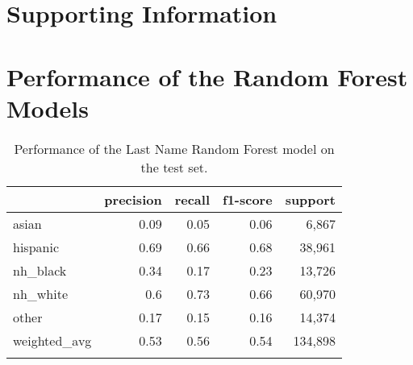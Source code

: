 \documentclass[12pt, letterpaper]{article}
\begin{document}
\clearpage


\clearpage

\appendix
\renewcommand{\thesection}{SI \arabic{section}}
\renewcommand\thetable{\thesection.\arabic{table}}  
\renewcommand\thefigure{\thesection.\arabic{figure}}
\section*{Supporting Information}\label{si}

\section{Performance of the Random Forest Models}\label{rf_perf}

\begin{table}[h!]
\centering
\caption{Performance of the Last Name Random Forest model on the test set.}
\begin{tabular}{lrrrr}
\hline
              &   precision &   recall &   f1-score &   support \\
\hline
 asian        &        0.09 &     0.05 &       0.06 &      6,867 \\
 hispanic     &        0.69 &     0.66 &       0.68 &     38,961 \\
 nh\_black     &        0.34 &     0.17 &       0.23 &     13,726 \\
 nh\_white     &        0.6  &     0.73 &       0.66 &     60,970 \\
 other        &        0.17 &     0.15 &       0.16 &     14,374 \\
 weighted\_avg &        0.53 &     0.56 &       0.54 &    134,898 \\
\hline
\label{table:rf_last_name}
\end{tabular}
\end{table}
\end{document}
